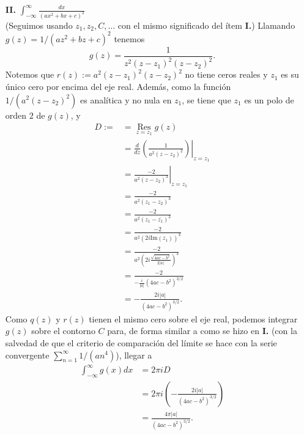 {\begin{itemize}
$$\begin{aligned}
         \end{aligned}
         $$
         y por tanto
         $$
         \begin{aligned}
            \int_{-\infty}^{\infty}f(x)dx&=2\pi i B\\
                                         &=2\pi i\cdot\sgn(a)\frac{1}{i\sqrt{4ac-b^2}}\\
                                         &=\sgn(a)\frac{2\pi}{\sqrt{4ac-b^2}}.
         \end{aligned}
         $$
      \item[\textbf{II.}] $\int_{-\infty}^{\infty} \frac{dx}{(ax^2+bx+c)^2}$\\
         (Seguimos usando $z_1,z_2,C,\dots$ con el mismo significado del ítem \textbf{I.}) Llamando $g(z)=1/(az^2+bz+c)^2$ tenemos
         $$
         g(z)=\frac{1}{z^2(z-z_1)^2(z-z_2)^2}.
         $$
         Notemos que $r(z):=a^2(z-z_1)^2(z-z_2)^2$ no tiene ceros reales y $z_1$ es su único cero por encima del eje real. Además, como la función $1/(a^2(z-z_2)^2)$ es analítica y no nula en $z_1$, se tiene que $z_1$ es un polo de orden $2$ de $g(z)$, y
         $$
         \begin{aligned}
            D:=&=\mathop{\mathrm{Res}}\limits_{z=z_1}g(z)\\
               &=\frac{d}{dz}\left.\left( \frac{1}{a^2(z-z_2)^2}\right)\right|_{z=z_1}\\
               &=\left. \frac{-2}{a^2(z-z_2)^3}\right|_{z=z_1}\\
               &=\frac{-2}{a^2(z_1-z_2)^3}\\
               &=\frac{-2}{a^2(z_1-\overline{z_1})^3}\\
               &=\frac{-2}{a^2\left( 2i\text{Im}(z_1)\right)^3}\\
               &=\frac{-2}{a^2\left( 2i\frac{\sqrt{4ac-b^2}}{2|a|}\right)^3}\\
               &=\frac{-2}{-\frac{i}{|a|}(4ac-b^2)^{3/2}}\\
               &=-\frac{2i|a|}{(4ac-b^2)^{3/2}}.
         \end{aligned}
         $$
         Como $q(z)$ y $r(z)$ tienen el mismo cero sobre el eje real, podemos integrar $g(z)$ sobre el contorno $C$ para, de forma similar a como se hizo en \textbf{I.} (con la salvedad de que el criterio de comparación del límite se hace con la serie convergente $\sum_{n=1}^{\infty}1/(an^4)$), llegar a
         $$
         \begin{aligned}
            \int_{-\infty}^{\infty}g(x)dx&=2\pi i D\\
                                         &=2\pi i\left( -\frac{2i|a|}{(4ac-b^2)^{3/2}}\right)\\
                                         &=\frac{4\pi|a|}{(4ac-b^2)^{3/2}}.
         \end{aligned}
         $$
   \end{itemize}
  }
\hfill\qedsymbol
